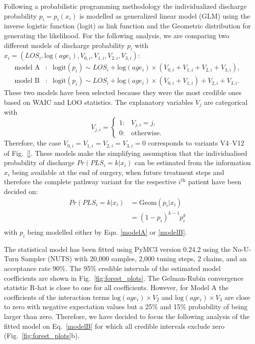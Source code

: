 Following a probabilistic programming methodology the individualized discharge probability $p_i = p_i(x_i)$ is modelled as generalized linear model (GLM) using the inverse logistic function (logit) as link function and the Geometric distribution for generating the likelihood. 
For the following analysis, we are comparing two different models of discharge probability $p_i$ with $x_i = (LOS_i, \text{log}(age_i), V_{0,i}, V_{1, i}, V_{2, i}, V_{3, i})$: 
\begin{eqnarray}
\label{modelA}\text{model A}&:& \text{logit}(p_i) \sim LOS_i + \text{log}(age_i) \times (V_{0,i} + V_{1,i} + V_{2,i} + V_{3,i}),\\
\label{modelB}\text{model B}&:& \text{logit}(p_i) \sim LOS_i + \text{log}(age_i) \times (V_{0,i} + V_{1,i}) + V_{2,i} + V_{3,i}. 
\end{eqnarray}
These two models have been selected because they were the most credible ones based on WAIC and LOO statistics. The explanatory variables $V_{j}$ are categorical with 
\begin{equation}
V_{j,i} = \begin{cases}
	1: & V_{j,i} = j,\\
        0: & \text{otherwise}.
\end{cases}
\end{equation}
Therefore, the case $V_{0,i}=V_{1,i}=V_{2,i}=V_{3,i}=0$ corresponds to variants V4--V12 of Fig.~\ref{}.
These models make the simplifying assumption that the individualised probability of discharge $Pr(PLS_i=k|x_i)$ can be estimated from the information $x_i$ being available at the end of surgery, when future treatment steps and therefore the complete pathway variant for the respective $i^\text{th}$ patient have been decided on:
\begin{equation}
\begin{split}
Pr(PLS_i=k|x_i) & = \text{Geom}(p_i|x_i) \\
                  & = (1-p_i)^{k-1}p_i^{k} \\
\end{split}
\end{equation}
with $p_i$ being modelled either by Eqn. \eqref{modelA} or \eqref{modelB}.

The statistical model has been fitted using PyMC3 \citep{Salvatier2016_PyMC3} version 0.24.2 using the No-U-Turn Sampler (NUTS) with 20,000 samples, 2,000 tuning steps, 2 chains, and an acceptance rate 90\%. The 95\% credible intervals of the estimated model coefficients are shown in Fig.~\ref{fig:forest_plots}. The Gelman-Rubin convergence statistic R-hat is close to one for all coefficients. 
However, for Model A the coefficients of the interaction terms $\text{log}(age_i)\times V_2$ and $\text{log}(age_i)\times V_3$ are close to zero with negative expectation values but a 25\% and 15\% probability of being larger than zero. 
Therefore, we have decided to focus the following analysis of the fitted model on Eq.~\ref{modelB} for which all credible intervals exclude zero (Fig.~\ref{fig:forest_plots}b).

